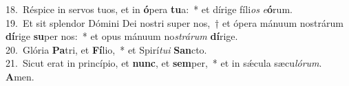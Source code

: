 {18.~}Réspice in servos tuos, et in \textbf{ó}pera \textbf{tu}a:~* et dírige fíli\textit{os} \textit{e}\textbf{ó}rum.\\
{19.~}Et sit splendor Dómini Dei nostri super nos,~† et ópera mánuum nostrárum \textbf{dí}rige \textbf{su}per nos:~* et opus mánuum no\textit{strá}\textit{rum} \textbf{dí}rige.\\
{20.~}Glória \textbf{Pa}tri, et \textbf{Fí}lio,~* et Spirí\textit{tu}\textit{i} \textbf{San}cto.\\
{21.~}Sicut erat in princípio, et \textbf{nunc}, et \textbf{sem}per,~* et in sǽcula sæcu\textit{ló}\textit{rum}. \textbf{A}men.\\
